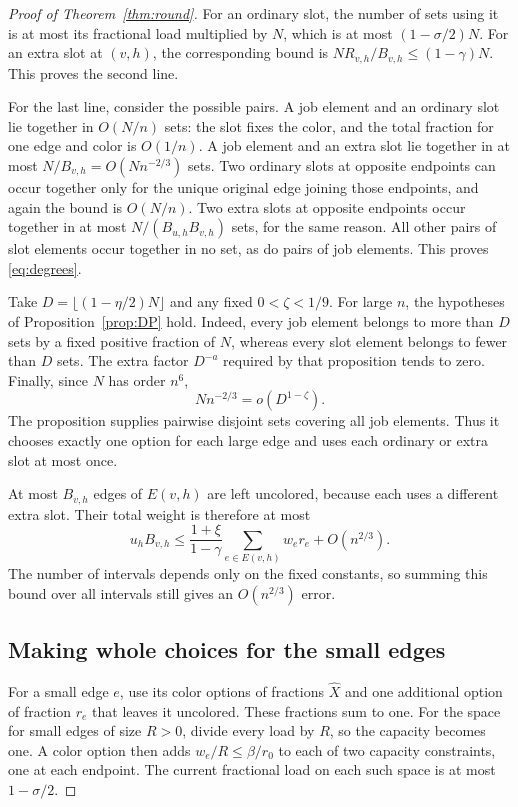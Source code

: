\documentclass[11pt]{article}
\theoremstyle{definition}\newtheorem{algorithm}{Algorithm}[section]
\numberwithin{equation}{section}
\theoremstyle{remark}\newtheorem*{remark}{Remark}
\begin{document}
\begin{proof}[Proof of Theorem~\ref{thm:round}]
For an ordinary slot, the number of sets using it is at most its
fractional load multiplied by $N$, which is at most $(1-\sigma/2)N$.
For an extra slot at $(v,h)$, the corresponding bound is
$NR_{v,h}/B_{v,h}\le(1-\gamma)N$. This proves the second line.

For the last line, consider the possible pairs. A job element and an
ordinary slot lie together in $O(N/n)$ sets: the slot fixes the color,
and the total fraction for one edge and color is $O(1/n)$.
A job element and an extra slot lie together in at most
$N/B_{v,h}=O(Nn^{-2/3})$ sets. Two ordinary slots at opposite endpoints
can occur together only for the unique original edge joining those
endpoints, and again the bound is $O(N/n)$. Two extra slots at opposite
endpoints occur together in at most $N/(B_{u,h}B_{v,h})$ sets, for the
same reason. All other pairs of slot elements occur together in no set,
as do pairs of job elements. This proves \eqref{eq:degrees}.

Take $D=\lfloor(1-\eta/2)N\rfloor$ and any fixed $0<\zeta<1/9$.
For large $n$, the hypotheses of Proposition~\ref{prop:DP} hold.
Indeed, every job element belongs to more than $D$ sets by a fixed
positive fraction of $N$, whereas every slot element belongs to fewer
than $D$ sets. The extra factor $D^{-a}$ required by that proposition
tends to zero. Finally, since $N$ has order $n^6$,
\[
 Nn^{-2/3}=o(D^{1-\zeta}).
\]
The proposition supplies pairwise disjoint sets covering all job
elements. Thus it chooses exactly one option for each large edge and
uses each ordinary or extra slot at most once.

At most $B_{v,h}$ edges of $E(v,h)$ are left uncolored, because each
uses a different extra slot. Their total weight is therefore at most
\begin{equation}\label{eq:residual}
 u_hB_{v,h}
 \le\frac{1+\xi}{1-\gamma}
                \sum_{e\in E(v,h)}w_er_e+O(n^{2/3}).
\end{equation}
The number of intervals depends only on the fixed constants, so summing
this bound over all intervals still gives an $O(n^{2/3})$ error.

\subsection*{Making whole choices for the small edges}
For a small edge $e$, use its color options of fractions $\widehat X$
and one additional option of fraction $r_e$ that leaves it uncolored.
These fractions sum to one. For the space for small edges of size $R>0$,
divide every load by $R$, so the capacity becomes one.
A color option then adds $w_e/R\le\beta/r_0$ to each of two capacity
constraints, one at each endpoint. The current fractional load on each
such space is at most $1-\sigma/2$.


\end{proof}
\end{document}

